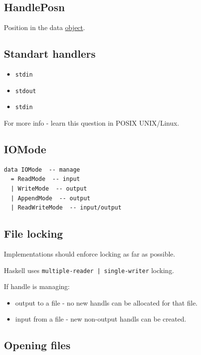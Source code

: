 \documentclass[a4paper,14pt,oneside]{book}
\begin{document}
\subsection{HandlePosn}
\label{sec:orgf22f4ff}

Position in the data \hyperref[org431f16b]{object}.

\subsection{Standart handlers}
\label{sec:org9826f4b}

\begin{itemize}
\item \texttt{stdin}
\item \texttt{stdout}
\item \texttt{stdin}
\end{itemize}

For more info - learn this question in POSIX UNIX/Linux.

\subsection{IOMode}
\label{sec:org45f749f}

\begin{verbatim}
data IOMode  -- manage
  = ReadMode  -- input
  | WriteMode  -- output
  | AppendMode  -- output
  | ReadWriteMode  -- input/output
\end{verbatim}

\subsection{File locking}
\label{sec:org24e64cb}

Implementations should enforce locking as far as possible.

Haskell uses \texttt{multiple-reader | single-writer} locking.

If handle is managing:
\begin{itemize}
\item output to a file - no new handls can be allocated for that file.

\item input from a file - new non-output handls can be created.
\end{itemize}

\subsection{Opening files}
\label{sec:org037b7f0}
\end{document}

